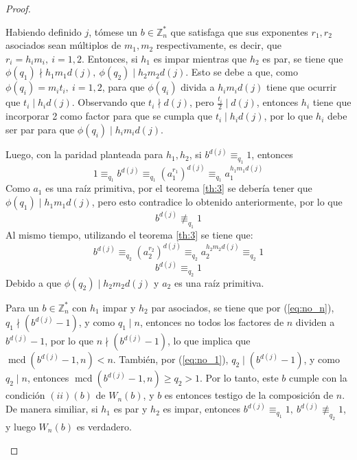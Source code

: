\documentclass[hidelinks, 12pt]{article}
\newcommand{\Zs}{\mathbb{Z}^*}
\DeclareMathOperator{\mcd}{mcd}
\begin{document}
\begin{proof}
\begin{itemize}
        Habiendo definido $j$, tómese un $b\in\Zs_n$ que satisfaga que sus exponentes $r_1,r_2$ asociados sean múltiplos de $m_1,m_2$ respectivamente, es decir, que $r_i=h_im_i,~i=1,2$. Entonces, si $h_1$ es impar mientras que $h_2$ es par, se tiene que $\phi(q_1)\nmid h_1m_1d(j),~\phi(q_2)\mid h_2m_2d(j)$. Esto se debe a que, como $\phi(q_i)=m_it_i,~i=1,2$, para que $\phi(q_i)$ divida a $h_im_id(j)$ tiene que ocurrir que $t_i\mid h_id(j)$. Observando que $t_i\nmid d(j)$, pero $\frac{t_i}{2}\mid d(j)$, entonces $h_i$ tiene que incorporar 2 como factor para que se cumpla que $t_i\mid h_id(j)$, por lo que $h_i$ debe ser par para que $\phi(q_i)\mid h_im_id(j)$. 

        Luego, con la paridad planteada para $h_1,h_2$, si $b^{d(j)}\equiv_{q_1}1$, entonces
        \[1\equiv_{q_1}b^{d(j)}\equiv_{q_1}(a_1^{r_1})^{d(j)}\equiv_{q_1}a_1^{h_1m_1d(j)}\]
        Como $a_1$ es una raíz primitiva, por el teorema \ref{th:3} se debería tener que $\phi(q_1)\mid h_1m_1d(j)$, pero esto contradice lo obtenido anteriormente, por lo que 
        \begin{equation}
            b^{d(j)}\not\equiv_{q_1}1
            \label{eq:no_n}
        \end{equation}
        Al mismo tiempo, utilizando el teorema \ref{th:3} se tiene que:
        \[b^{d(j)}\equiv_{q_2}(a_2^{r_2})^{d(j)}\equiv_{q_2}a_2^{h_2m_2d(j)}\equiv_{q_2}1\]
        \begin{equation}
            b^{d(j)}\equiv_{q_2}1
            \label{eq:no_1}
        \end{equation}
        Debido a que $\phi(q_2)\mid h_2m_2d(j)$ y $a_2$ es una raíz primitiva. 
        
        Para un $b\in\Zs_n$ con $h_1$ impar y $h_2$ par asociados, se tiene que por (\ref{eq:no_n}), $q_1\nmid (b^{d(j)}-1)$, y como $q_1\mid n$, entonces no todos los factores de $n$ dividen a $b^{d(j)}-1$, por lo que $n\nmid(b^{d(j)}-1)$, lo que implica que $\mcd(b^{d(j)}-1,n)<n$. También, por (\ref{eq:no_1}), $q_2\mid (b^{d(j)}-1)$, y como $q_2\mid n$, entonces $\mcd(b^{d(j)}-1,n)\geq q_2>1$. Por lo tanto, este $b$ cumple con la condición $(ii)(b)$ de $W_n(b)$, y $b$ es entonces testigo de la composición de $n$. De manera similiar, si $h_1$ es par y $h_2$ es impar, entonces $b^{d(j)}\equiv_{q_1}1,~b^{d(j)}\not\equiv_{q_2}1$, y luego $W_n(b)$ es verdadero.


\end{itemize}
\end{proof}
\end{document}
